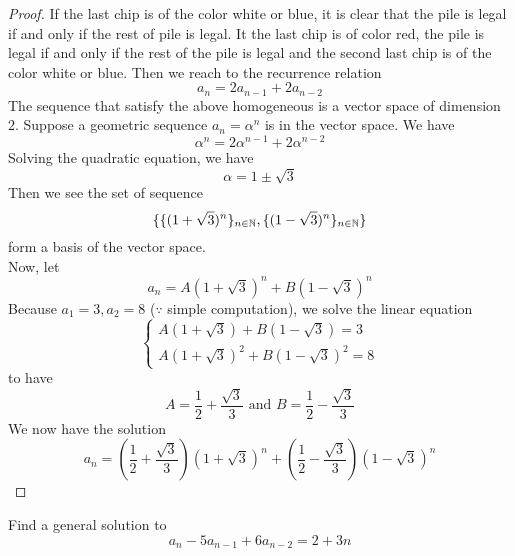 \documentclass{report}
\begin{document}
\begin{proof}
If the last chip is of the color white or blue, it is clear that the pile is legal if and only if the rest of pile is legal. It the last chip is of color red, the pile is legal if and only if the rest of the pile is legal and the second last chip is of the color white or blue. Then we reach to the recurrence relation
\begin{equation*}
  a_n=2a_{n-1}+2a_{n-2}
\end{equation*}
The sequence that satisfy the above homogeneous is a vector space of dimension $2$. Suppose a geometric sequence $a_n=\alpha^n$ is in the vector space. We have
\begin{equation*}
\alpha^n=2\alpha ^{n-1}+2\alpha ^{n-2}
\end{equation*}
Solving the quadratic equation, we have 
\begin{equation*}
\alpha =1 \pm \sqrt{3} 
\end{equation*}
Then we see the set of sequence 
\begin{equation*}
\{ \{ (1+\sqrt{3} )^n \}_{n\in\mathbb{N}},\{ (1-\sqrt{3} )^n \}_{n\in\mathbb{N}} \}
\end{equation*}
form a basis of the vector space.\\

Now, let 
\begin{equation*}
a_n=A(1+\sqrt{3} )^n+B(1-\sqrt{3} )^n
\end{equation*}
Because $a_1=3,a_2=8$  ($\because$ simple computation), we solve the linear equation  
\begin{equation*}
  \begin{cases}
    A(1+\sqrt{3} )+B(1-\sqrt{3} )=3\\
    A(1+\sqrt{3} )^2+B(1-\sqrt{3} )^2=8
  \end{cases}
\end{equation*}
to have
\begin{equation*}
A=\frac{1}{2}+\frac{\sqrt{3} }{3}\text{ and }B=\frac{1}{2}-\frac{\sqrt{3} }{3}
\end{equation*}
We now have the solution 
\begin{equation*}
  a_n=(\frac{1}{2}+\frac{\sqrt{3} }{3}) (1+\sqrt{3} )^n +(\frac{1}{2}-\frac{\sqrt{3} }{3} )(1-\sqrt{3} )^n
\end{equation*}
\end{proof}
\begin{question}{}{}
Find a general solution to 
\begin{equation*}
a_n-5a_{n-1}+6a_{n-2}=2+3n
\end{equation*}
\end{question}
\end{document}
